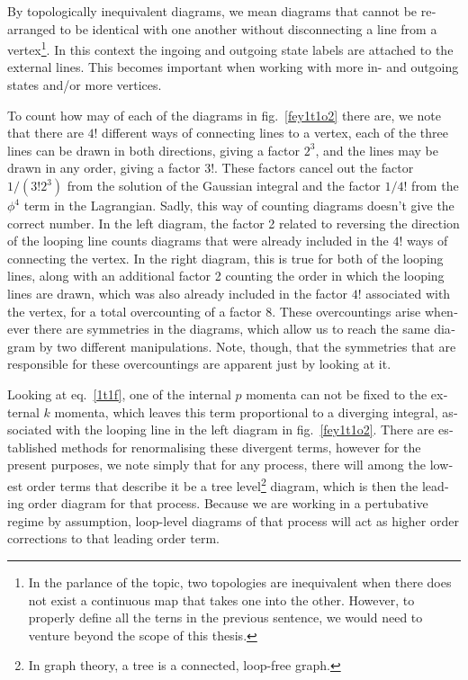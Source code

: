 \begin{english}
By topologically inequivalent diagrams, we mean diagrams that cannot be rearranged to be identical with one another without disconnecting a line from a vertex\footnote{In the parlance of the topic, two topologies are inequivalent when there does not exist a continuous map that takes one into the other. However, to properly define all the terns in the previous sentence, we would need to venture beyond the scope of this thesis.}. In this context the ingoing and outgoing state labels are attached to the external lines. This becomes important when working with more in- and outgoing states and/or more vertices.

To count how may of each of the diagrams in fig.~\ref{fey1t1o2} there are, we note that there are $4!$ different ways of connecting lines to a vertex, each of the three lines can be drawn in both directions, giving a factor $2^3$, and the lines may be drawn in any order, giving a factor $3!$. These factors cancel out the factor $1/(3!2^3)$ from the solution of the Gaussian integral and the factor $1/4!$ from the $\phi^4$ term in the Lagrangian. Sadly, this way of counting diagrams doesn't give the correct number. In the left diagram, the factor 2 related to reversing the direction of the looping line counts diagrams that were already included in the $4!$ ways of connecting the vertex. In the right diagram, this is true for both of the looping lines, along with an additional factor 2 counting the order in which the looping lines are drawn, which was also already included in the factor $4!$ associated with the vertex, for a total overcounting of a factor $8$. These overcountings arise whenever there are symmetries in the diagrams, which allow us to reach the same diagram by two different manipulations. Note, though, that the symmetries that are responsible for these overcountings are apparent just by looking at it.

Looking at eq.~\eqref{1t1f}, one of the internal $p$ momenta can not be fixed to the external $k$ momenta, which leaves this term proportional to a diverging integral, associated with the looping line in the left diagram in fig.~\ref{fey1t1o2}. There are established methods for renormalising these divergent terms, however for the present purposes, we note simply that for any process, there will among the lowest order terms that describe it be a tree level\footnote{In graph theory, a tree is a connected, loop-free graph.} diagram, which is then the leading order diagram for that process. Because we are working in a pertubative regime by assumption, loop-level diagrams of that process will act as higher order corrections to that leading order term.


\end{english}
